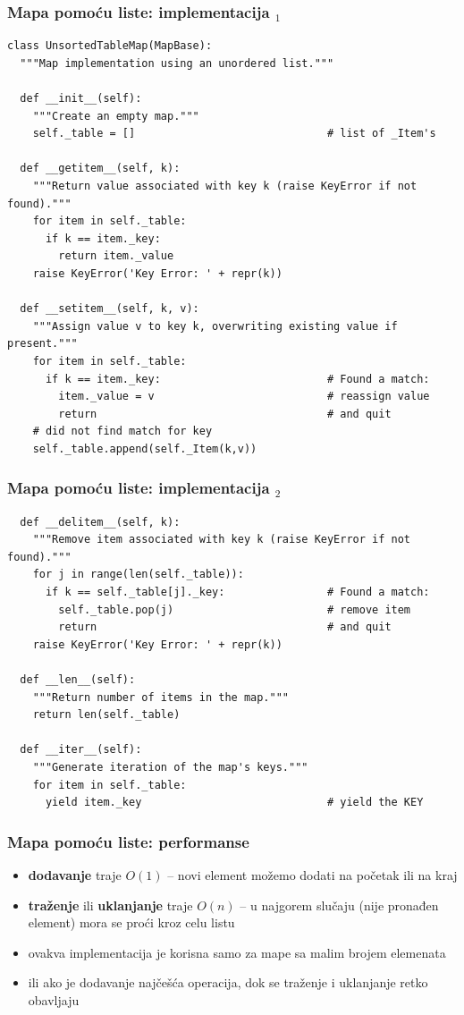 \documentclass[compress]{beamer}
\begin{document}
\begin{frame}
  \frametitle{Mapa pomoću liste: implementacija $_1$}
\begin{verbatim}
class UnsortedTableMap(MapBase):
  """Map implementation using an unordered list."""

  def __init__(self):
    """Create an empty map."""
    self._table = []                              # list of _Item's
  
  def __getitem__(self, k):
    """Return value associated with key k (raise KeyError if not found)."""
    for item in self._table:
      if k == item._key:
        return item._value
    raise KeyError('Key Error: ' + repr(k))

  def __setitem__(self, k, v):
    """Assign value v to key k, overwriting existing value if present."""
    for item in self._table:
      if k == item._key:                          # Found a match:
        item._value = v                           # reassign value
        return                                    # and quit    
    # did not find match for key
    self._table.append(self._Item(k,v))
\end{verbatim}
\end{frame}

\begin{frame}[fragile,shrink=25]
  \frametitle{Mapa pomoću liste: implementacija $_2$}
\begin{verbatim}
  def __delitem__(self, k):
    """Remove item associated with key k (raise KeyError if not found)."""
    for j in range(len(self._table)):
      if k == self._table[j]._key:                # Found a match:
        self._table.pop(j)                        # remove item
        return                                    # and quit    
    raise KeyError('Key Error: ' + repr(k))

  def __len__(self):
    """Return number of items in the map."""
    return len(self._table)

  def __iter__(self):                             
    """Generate iteration of the map's keys."""
    for item in self._table:
      yield item._key                             # yield the KEY
\end{verbatim}
\end{frame}

\begin{frame}[fragile]
  \frametitle{Mapa pomoću liste: performanse}
  \begin{itemize}
    \item \textbf{dodavanje} traje $O(1)$ -- novi element možemo dodati na početak ili na kraj  
    \item \textbf{traženje} ili \textbf{uklanjanje} traje $O(n)$ -- u najgorem slučaju (nije pronađen element) mora se proći kroz celu listu
    \item ovakva implementacija je korisna samo za mape sa malim brojem elemenata
    \item ili ako je dodavanje najčešća operacija, dok se traženje i uklanjanje retko obavljaju
  \end{itemize}
\end{frame}
\end{document}
